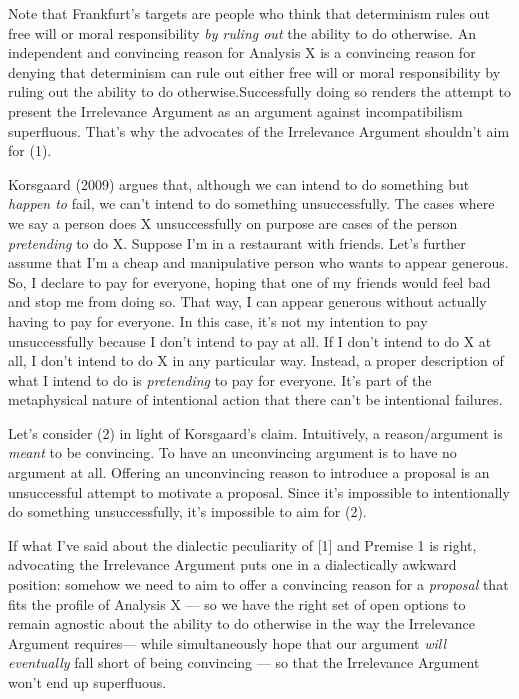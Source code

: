 \documentclass[a4paper,12pt]{article}
\begin{document}
Note that Frankfurt's targets are people who think that determinism rules out free will or moral responsibility \emph{by ruling out} the ability to do otherwise. An independent and convincing reason for Analysis X is a convincing reason for denying that determinism can rule out either free will or moral responsibility by ruling out the ability to do otherwise.\footnotemark Successfully doing so renders the attempt to present the Irrelevance Argument as an argument against incompatibilism superfluous. That's why the advocates of the Irrelevance Argument shouldn't aim for (1).


Korsgaard (2009) argues that, although we can intend to do something but \emph{happen to} fail, we can't intend to do something unsuccessfully. The cases where we say a person does X unsuccessfully on purpose are cases of the person \emph{pretending} to do X. Suppose I'm in a restaurant with friends. Let's further assume that I'm a cheap and manipulative person who wants to appear generous. So, I declare to pay for everyone, hoping that one of my friends would feel bad and stop me from doing so. That way, I can appear generous without actually having to pay for everyone. In this case, it's not my intention to pay unsuccessfully because I don't intend to pay at all. If I don't intend to do X at all, I don't intend to do X in any particular way. Instead, a proper description of what I intend to do is \emph{pretending} to pay for everyone. It's part of the metaphysical nature of intentional action that there can't be intentional failures.

Let's consider (2) in light of Korsgaard's claim. Intuitively, a reason/argument is \emph{meant} to be convincing. To have an unconvincing argument is to have no argument at all. Offering an unconvincing reason to introduce a proposal is an unsuccessful attempt to motivate a proposal. Since it's impossible to intentionally do something unsuccessfully, it's impossible to aim for (2).

If what I've said about the dialectic peculiarity of [1] and Premise 1 is right, advocating the Irrelevance Argument puts one in a dialectically awkward position: somehow we need to aim to offer a convincing reason for a \emph{proposal} that fits the profile of Analysis X --- so we have the right set of open options to remain agnostic about the ability to do otherwise in the way the Irrelevance Argument requires\footnotemark --- while simultaneously hope that our argument \emph{will eventually} fall short of being convincing --- so that the Irrelevance Argument won't end up superfluous.
\end{document}
